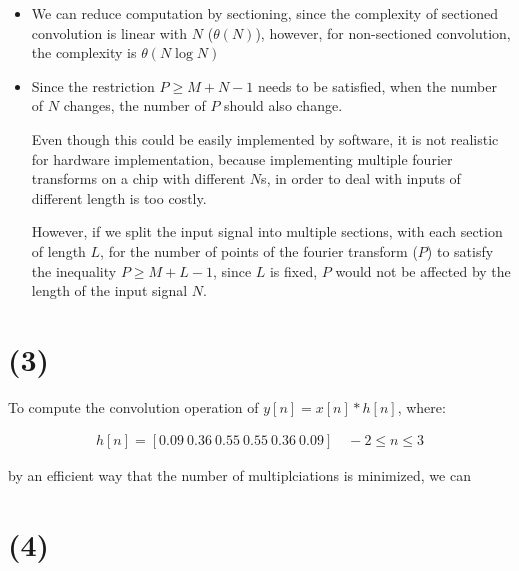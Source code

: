 \documentclass{article}
\begin{document}
\begin{itemize}
    \item We can reduce computation by sectioning, since the complexity of sectioned convolution is linear with $N$ ($\mathbb{\theta}(N)$),
    however, for non-sectioned convolution, the complexity is $\mathbb{\theta}(N \log N)$
    \item Since the restriction $P \geq M + N - 1$ needs to be satisfied, 
    when the number of $N$ changes, the number of $P$ should also change.
    \bigskip

    Even though this could be easily implemented by software, 
    it is not realistic for hardware implementation,
    because implementing multiple fourier transforms on a chip with different $N$s, 
    in order to deal with inputs of different length is too costly.
    \bigskip

    However, if we split the input signal into multiple sections,
    with each section of length $L$, 
    for the number of points of the fourier transform ($P$) to satisfy the inequality $P \geq M + L - 1$, 
    since $L$ is fixed, $P$ would not be affected by the length of the input signal $N$.
\end{itemize}

\section*{(3)}

To compute the convolution operation of $y[n] =  x[n] * h[n]$, where:

\begin{align*}
    h[n] = [0.09 \ 0.36 \ 0.55 \ 0.55 \ 0.36 \ 0.09] \quad -2 \leq n \leq 3 
\end{align*}

by an efficient way that the number of multiplciations is minimized, 
we can 

\section*{(4)}
\end{document}
